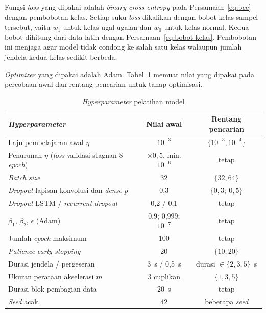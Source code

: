 Fungsi \textit{loss} yang dipakai adalah \textit{binary cross-entropy} pada Persamaan~\ref{eq:bce} dengan pembobotan kelas. Setiap suku \textit{loss} dikalikan dengan bobot kelas sampel tersebut, yaitu $w_{1}$ untuk kelas ugal-ugalan dan $w_{0}$ untuk kelas normal. Kedua bobot dihitung dari data latih dengan Persamaan~\ref{eq:bobot-kelas}. Pembobotan ini menjaga agar model tidak condong ke salah satu kelas walaupun jumlah jendela kedua kelas sedikit berbeda.

\textit{Optimizer} yang dipakai adalah Adam. Tabel~\ref{tab:hyperparameter} memuat nilai yang dipakai pada percobaan awal dan rentang pencarian untuk tahap optimisasi.

\begin{table}[H]
  \centering
  \caption{\textit{Hyperparameter} pelatihan model}
  \label{tab:hyperparameter}
  \small
  \begin{tabular}{|l|c|c|}
    \hline
    \textbf{\textit{Hyperparameter}} & \textbf{Nilai awal} & \textbf{Rentang pencarian} \\
    \hline
    Laju pembelajaran awal $\eta$ & $10^{-3}$ & $\{10^{-3}, 10^{-4}\}$ \\
    \hline
    Penurunan $\eta$ (\textit{loss} validasi stagnan 8 \textit{epoch}) & $\times 0{,}5$, min. $10^{-6}$ & tetap \\
    \hline
    \textit{Batch size} & 32 & $\{32, 64\}$ \\
    \hline
    \textit{Dropout} lapisan konvolusi dan \textit{dense} $p$ & 0,3 & $\{0{,}3;\ 0{,}5\}$ \\
    \hline
    \textit{Dropout} LSTM / \textit{recurrent dropout} & 0,2 / 0,1 & tetap \\
    \hline
    $\beta_{1}$, $\beta_{2}$, $\epsilon$ (Adam) & 0,9; 0,999; $10^{-7}$ & tetap \\
    \hline
    Jumlah \textit{epoch} maksimum & 100 & tetap \\
    \hline
    \textit{Patience} \textit{early stopping} & 20 & $\{10, 20\}$ \\
    \hline
    Durasi jendela / pergeseran & 3~s / 0,5~s & durasi $\in \{2, 3, 5\}$~s \\
    \hline
    Ukuran perataan akselerasi $m$ & 3 cuplikan & $\{1, 3, 5\}$ \\
    \hline
    Durasi blok pembagian data & 20~s & tetap \\
    \hline
    \textit{Seed} acak & 42 & beberapa \textit{seed} \\
    \hline
  \end{tabular}
\end{table}

